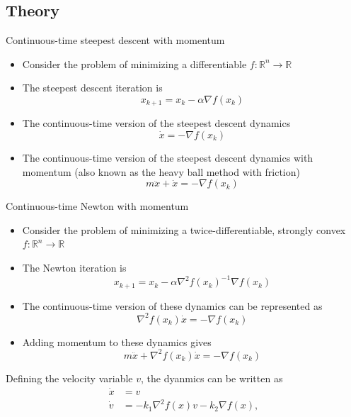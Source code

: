 \subsection{Theory}
\begin{frame}{Continuous-time steepest descent with momentum}
\begin{itemize}
\item Consider the problem of minimizing a differentiable $f:\mathbb{R}^n\rightarrow \mathbb{R}$
\pause
\item The steepest descent iteration is
\begin{equation}
x_{k+1}=x_k - \alpha \nabla f(x_k)
\end{equation}
\pause
\item The continuous-time version of the steepest descent dynamics 
\begin{equation}
\dot{x}= - \nabla f(x_k)
\end{equation}
\pause
\item The continuous-time version of the steepest descent dynamics with momentum (also known as the heavy ball method with friction) 
\begin{equation}
m\ddot{x}+ \dot{x}= - \nabla f(x_k)
\end{equation}
\end{itemize}
\end{frame}
\begin{frame}{Continuous-time Newton with momentum}
\begin{itemize}
	\item Consider the problem of minimizing a twice-differentiable, strongly convex $f:\mathbb{R}^n\rightarrow \mathbb{R}$
	\pause
	\item The Newton iteration is
	\begin{equation}
	x_{k+1}=x_k - \alpha\nabla^2f(x_k)^{-1} \nabla f(x_k)
	\end{equation}
	\pause
	\item The continuous-time version of these dynamics can be represented as
	\begin{equation}
	\nabla^2f(x_k)\dot{x}= - \nabla f(x_k)
	\end{equation}
	\pause
	\item Adding momentum to these dynamics gives  
	\begin{equation}
	m\ddot{x}+ \nabla^2f(x_k)\dot{x}= - \nabla f(x_k)
	\end{equation}
\end{itemize}
\pause
Defining the velocity variable $v$, the dyanmics can be written as 
\begin{equation} \label{eqn: second_order_newton_cont_time}
\begin{split}
\Dot{x}&=v\\
\Dot{v}&=-k_1\nabla^2 f(x) v -k_2 \nabla f(x), 
\end{split}
\end{equation}
\end{frame}
